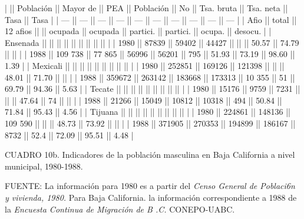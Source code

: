 \documentclass{article}
\begin{document}
|          || Población || Mayor de || PEA     || Población || No      || Tsa. bruta || Tsa. neta || Tasa   || Tasa    |
| ---      || ---       || ---      || ---     || ---       || ---     || ---        || ---       || ---    || ---     |
| Afio     || total     || 12 afios ||         || ocupada   || ocupada || partici.   || partici.  || ocupa. || desocu. |
| Ensenada ||           ||          ||         ||           ||         ||            ||           ||        ||         |
| 1980     || 87839     || 59402    || 44427   ||           ||         || 50.57      || 74.79     ||        ||         |
| 1988     || 109 738   || 77 865   || 56996   || 56201     || 795     || 51.93      || 73.19     || 98.60  || 1.39    |
| Mexicali ||           ||          ||         ||           ||         ||            ||           ||        ||         |
| 1980     || 252851    || 169126   || 121398  ||           ||         || 48.01      || 71.70     ||        ||         |
| 1988     || 359672    || 263142   || 183668  || 173313    || 10 355  || 51         || 69.79     || 94.36  || 5.63    |
| Tecate   ||           ||          ||         ||           ||         ||            ||           ||        ||         |
| 1980     || 15176     || 9759     || 7231    ||           ||         || 47.64      || 74        ||        ||         |
| 1988     || 21266     || 15049    || 10812   || 10318     || 494     || 50.84      || 71.84     || 95.43  || 4.56    |
| Tijuana  ||           ||          ||         ||           ||         ||            ||           ||        ||         |
| 1980     || 224861    || 148136   || 109 590 ||           ||         || 48.73      || 73.92     ||        ||         |
| 1988     || 371905    || 270353   || 194899  || 186167    || 8732    || 52.4       || 72.09     || 95.51  || 4.48    |

CUADRO 10b. Indicadores de la población masculina en Baja California a nivel municipal, 1980-1988.

FUENTE: La información para 1980 es a partir del \textit{Censo General de Poblaci6n y vivienda, 1980.} Para Baja California. la información correspondiente a 1988 de la \textit{Encuesta Continua de Migración de B .C.} CONEPO-UABC.
\end{document}
